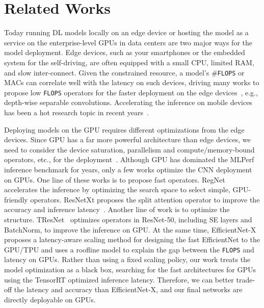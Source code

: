 \documentclass[10pt,twocolumn,letterpaper]{article}
\begin{document}
\section{Related Works}

Today running DL models locally on an edge device or hosting the model as a service on the enterprise-level GPUs in data centers are two major ways for the model deployment. Edge devices, such as your smartphones or the embedded system for the self-driving, are often equipped with a small CPU, limited RAM, and slow inter-connect. Given the constrained resource, a model's \#{\tt FLOPS} or MACs can correlate well with the latency on such devices, driving many works to propose low {\tt FLOPS} operators for the faster deployment on the edge devices~\cite{howard2017mobilenets, sandler2018mobilenetv2, ramachandran2017searching}, e.g., depth-wise separable convolutions. Accelerating the inference on mobile devices has been a hot research topic in recent years~\cite{cai2018proxylessnas, wu2019fbnet, howard2019searching}.

Deploying models on the GPU requires different optimizations from the edge devices. Since GPU has a far more powerful architecture than edge devices, we need to consider the device saturation, parallelism and compute/memory-bound operators, etc., for the deployment~\cite{li2021searching}. Although GPU has dominated the MLPerf inference benchmark for years, only a few works optimize the CNN deployment on GPUs. One line of these works is to propose fast operators. RegNet~\cite{radosavovic2020designing} accelerates the inference by optimizing the search space to select simple, GPU-friendly operators. ResNetXt proposes the split attention operator to improve the accuracy and inference latency~\cite{zhang2020resnest}. Another line of work is to optimize the structure. TResNet~\cite{ridnik2021tresnet} optimizes operators in ResNet-50, including SE layers and BatchNorm, to improve the inference on GPU. At the same time, EfficientNet-X~\cite{li2021searching} proposes a latency-aware scaling method for designing the fast EfficientNet to the GPU/TPU and uses a roofline model to explain the gap between the {\tt FLOPS} and latency on GPUs. Rather than using a fixed scaling policy, our work treats the model optimization as a black box, searching for the fast architectures for GPUs using the TensorRT optimized inference latency. Therefore, we can better trade-off the latency and accuracy than EfficientNet-X, and our final networks are directly deployable on GPUs.
\end{document}
